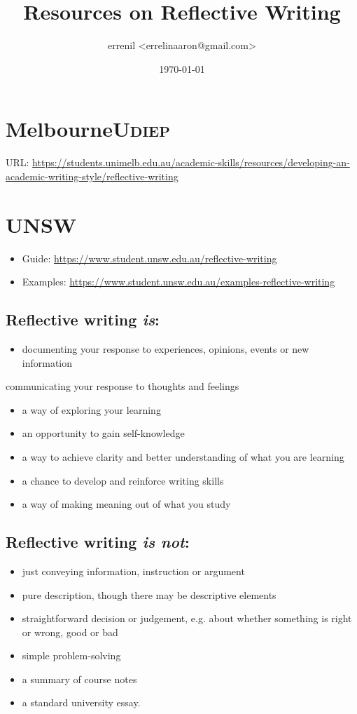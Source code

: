 \documentclass[11pt]{article}
\author{errenil <errelinaaron@gmail.com>}
\date{\today}
\title{Resources on Reflective Writing}
\begin{document}
\maketitle
\tableofcontents


\section{MelbourneU\hfill{}\textsc{diep}}
\label{sec:orga1dc854}
URL: \url{https://students.unimelb.edu.au/academic-skills/resources/developing-an-academic-writing-style/reflective-writing}


\section{UNSW}
\label{sec:orgd4ccebd}
\begin{itemize}
\item Guide: \url{https://www.student.unsw.edu.au/reflective-writing}
\item Examples: \url{https://www.student.unsw.edu.au/examples-reflective-writing}
\end{itemize}

\subsection{Reflective writing \emph{is}:}
\label{sec:orgabf3c65}
\begin{itemize}
\item documenting your response to experiences, opinions, events or new information
\end{itemize}
communicating your response to thoughts and feelings
\begin{itemize}
\item a way of exploring your learning
\item an opportunity to gain self-knowledge
\item a way to achieve clarity and better understanding of what you are learning
\item a chance to develop and reinforce writing skills
\item a way of making meaning out of what you study
\end{itemize}

\subsection{Reflective writing \emph{is not}:}
\label{sec:orgef00152}
\begin{itemize}
\item just conveying information, instruction or argument
\item pure description, though there may be descriptive elements
\item straightforward decision or judgement, e.g. about whether something is right or wrong, good or bad
\item simple problem-solving
\item a summary of course notes
\item a standard university essay.
\end{itemize}
\end{document}
